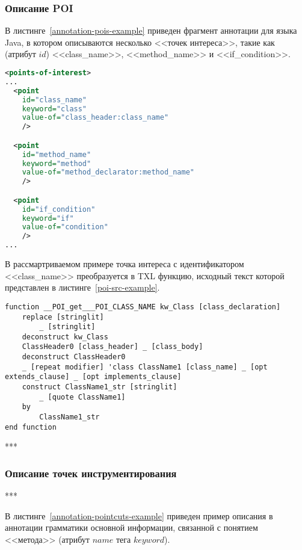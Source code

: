 \subsubsection{Описание POI}

В листинге~\ref{annotation-pois-example} приведен фрагмент аннотации для языка Java, в котором описываются несколько <<точек интереса>>, такие как (атрибут $id$) <<class\_name>>, <<method\_name>> и <<if\_condition>>.

\begin{lstlisting}[frame=single, language=XML, label={annotation-pois-example}, caption={Пример}]
<points-of-interest>
...
  <point
    id="class_name"
    keyword="class"
    value-of="class_header:class_name"
    />

  <point
    id="method_name"
    keyword="method"
    value-of="method_declarator:method_name"
    />

  <point
    id="if_condition"
    keyword="if"
    value-of="condition"
    />
...
\end{lstlisting}

В рассмартриваемом примере точка интереса с идентификатором <<class\_name>> преобразуется в TXL функцию, исходный текст которой представлен в листинге~\ref{poi-src-example}.

\begin{lstlisting}[frame=single, language=TXL, label={poi-src-example}, caption={Пример синтезированной функции для точки интереса <<class\_name>>}]
function __POI_get___POI_CLASS_NAME kw_Class [class_declaration]
	replace [stringlit]
		_ [stringlit]
	deconstruct kw_Class
    ClassHeader0 [class_header] _ [class_body]
	deconstruct ClassHeader0
    _ [repeat modifier] 'class ClassName1 [class_name] _ [opt extends_clause] _ [opt implements_clause]
	construct ClassName1_str [stringlit]
		_ [quote ClassName1]
	by
		ClassName1_str
end function
\end{lstlisting}

***

\subsubsection{Описание точек инструментирования}

***

В листинге~\ref{annotation-pointcuts-example} приведен пример описания в аннотации грамматики основной информации, связанной с понятием <<метода>> (атрибут $name$ тега $keyword$).

